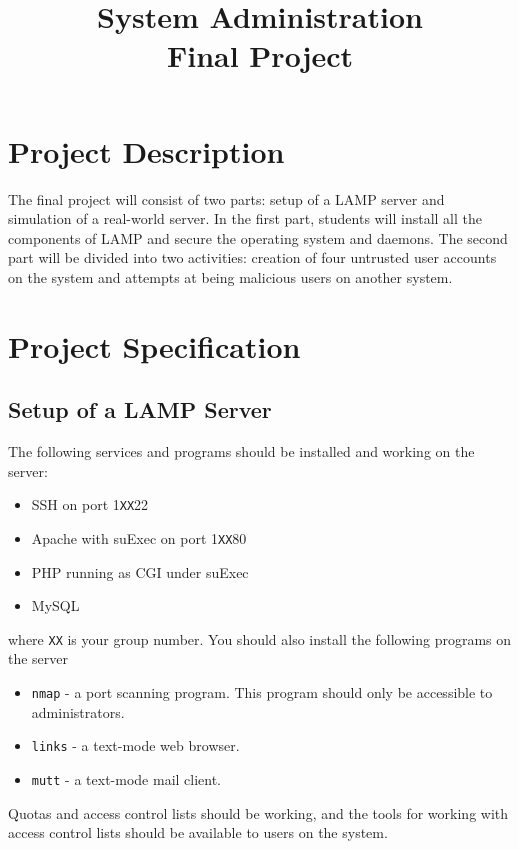 \documentclass[10pt]{article}
\begin{document}
\title{System Administration\\
Final Project}

\maketitle
\section{Project Description}

The final project will consist of two parts: setup of a LAMP server
and simulation of a real-world server. In the first part, students
will install all the components of LAMP and secure the operating system
and daemons. The second part will be divided into two activities:
creation of four untrusted user accounts on the system and attempts
at being malicious users on another system.


\section{Project Specification}

\subsection{Setup of a LAMP Server }

The following services and programs should be installed and working
on the server: 

\begin{itemize}
\item SSH on port 1\texttt{XX}22
\item Apache with suExec on port 1\texttt{XX}80
\item PHP running as CGI under suExec
\item MySQL
\end{itemize}
where \texttt{XX} is your group number. You should also install the
following programs on the server

\begin{itemize}
\item \texttt{nmap} - a port scanning program. This program should only
be accessible to administrators.
\item \texttt{links} - a text-mode web browser.
\item \texttt{mutt} - a text-mode mail client.
\end{itemize}
Quotas and access control lists should be working, and the tools for
working with access control lists should be available to users on
the system.
\end{document}
